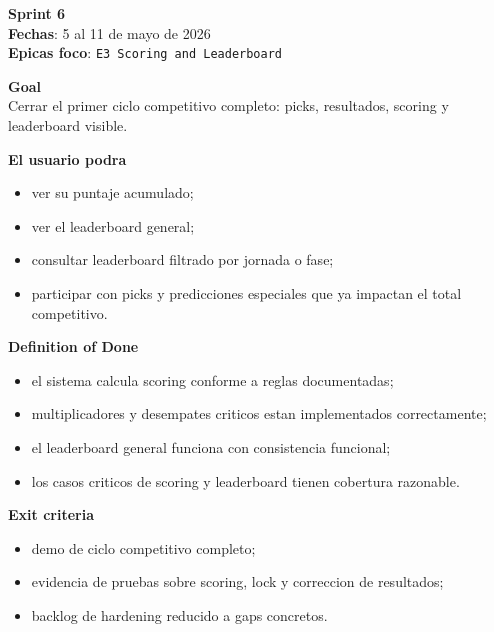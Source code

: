 \begin{docnote}
\textbf{Sprint 6}\\
\textbf{Fechas}: 5 al 11 de mayo de 2026\\
\textbf{Epicas foco}: \texttt{E3 Scoring and Leaderboard}

\textbf{Goal}\\
Cerrar el primer ciclo competitivo completo: picks, resultados, scoring y leaderboard visible.

\textbf{El usuario podra}\\
\begin{itemize}
  \item ver su puntaje acumulado;
  \item ver el leaderboard general;
  \item consultar leaderboard filtrado por jornada o fase;
  \item participar con picks y predicciones especiales que ya impactan el total competitivo.
\end{itemize}

\textbf{Definition of Done}\\
\begin{itemize}
  \item el sistema calcula scoring conforme a reglas documentadas;
  \item multiplicadores y desempates criticos estan implementados correctamente;
  \item el leaderboard general funciona con consistencia funcional;
  \item los casos criticos de scoring y leaderboard tienen cobertura razonable.
\end{itemize}

\textbf{Exit criteria}\\
\begin{itemize}
  \item demo de ciclo competitivo completo;
  \item evidencia de pruebas sobre scoring, lock y correccion de resultados;
  \item backlog de hardening reducido a gaps concretos.
\end{itemize}
\end{docnote}

